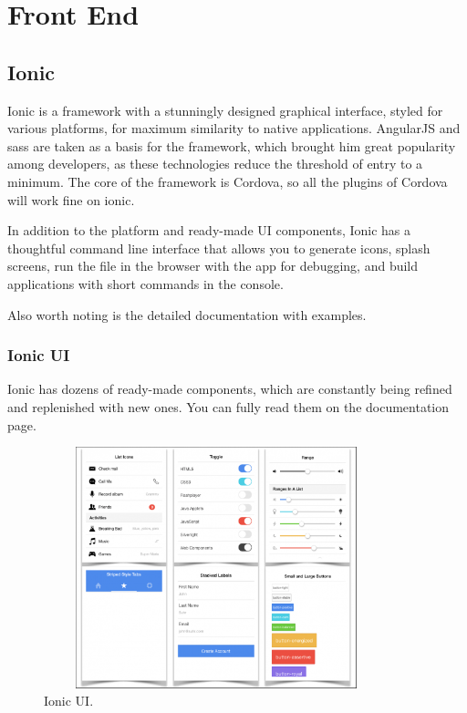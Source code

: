 \section{Front End}

\subsection{Ionic}
Ionic is a framework with a stunningly designed graphical interface, styled for various platforms, for maximum similarity to native applications. AngularJS and sass are taken as a basis for the framework, which brought him great popularity among developers, as these technologies reduce the threshold of entry to a minimum. The core of the framework is Cordova, so all the plugins of Cordova will work fine on ionic.\par In addition to the platform and ready-made UI components, Ionic has a thoughtful command line interface that allows you to generate icons, splash screens, run the file in the browser with the app for debugging, and build applications with short commands in the console.\par Also worth noting is the detailed documentation with examples.\cite{Ionic}

\subsubsection{Ionic UI}
Ionic has dozens of ready-made components, which are constantly being refined and replenished with new ones. You can fully read them on the documentation page.\cite{IonicUI}

\begin{figure}[h]
\centering
\includegraphics[width=10cm, height=7cm]{img/IonicUI.png}
\caption{Ionic UI.}
\end{figure}

